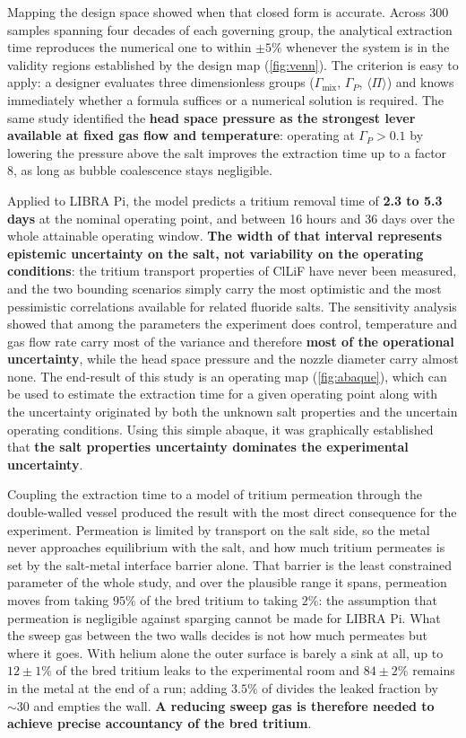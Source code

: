 \documentclass[a4paper,11pt,oneside]{report}
\newcommand{\Gmix}{\ensuremath{\Gamma_\mathrm{mix}}}
\newcommand{\Gp}{\ensuremath{\Gamma_P}}
\newcommand{\PI}{\ensuremath{\langle \Pi \rangle}}
\newcounter{assumption}[chapter]
\begin{document}
Mapping the design space showed when that closed form is accurate. Across 300 samples spanning four decades of each governing group, the analytical extraction time reproduces the numerical one to within $\pm5\%$ whenever the system is in the validity regions established by the design map (\cref{fig:venn}). The criterion is easy to apply: a designer evaluates three dimensionless groups (\Gmix, \Gp, \PI) and knows immediately whether a formula suffices or a numerical solution is required. The same study identified the \textbf{head space pressure as the strongest lever available at fixed gas flow and temperature}: operating at $\Gp>0.1$ by lowering the pressure above the salt improves the extraction time up to a factor 8, as long as bubble coalescence stays negligible.


Applied to LIBRA Pi, the model predicts a tritium removal time of \textbf{2.3 to 5.3 days} at the nominal operating point, and between 16 hours and 36 days over the whole attainable operating window. \textbf{The width of that interval represents epistemic uncertainty on the salt, not variability on the operating conditions}: the tritium transport properties of ClLiF have never been measured, and the two bounding scenarios simply carry the most optimistic and the most pessimistic correlations available for related fluoride salts. The sensitivity analysis showed that among the parameters the experiment does control, temperature and gas flow rate carry most of the variance and therefore \textbf{most of the operational uncertainty}, while the head space pressure and the nozzle diameter carry almost none. The end-result of this study is an operating map (\cref{fig:abaque}), which can be used to estimate the extraction time for a given operating point along with the uncertainty originated by both the unknown salt properties and the uncertain operating conditions. Using this simple abaque, it was graphically established that \textbf{the salt properties uncertainty dominates the experimental uncertainty}. 

Coupling the extraction time to a model of tritium permeation through the double-walled vessel produced the result with the most direct consequence for the experiment. Permeation is limited by transport on the salt side, so the metal never approaches equilibrium with the salt, and how much tritium permeates is set by the salt-metal interface barrier alone. That barrier is the least constrained parameter of the whole study, and over the plausible range it spans, permeation moves from taking $95\%$ of the bred tritium to taking $2\%$: the assumption that permeation is negligible against sparging cannot be made for LIBRA Pi. What the sweep gas between the two walls decides is not how much permeates but where it goes. With helium alone the outer surface is barely a sink at all, up to $12\pm1\%$ of the bred tritium leaks to the experimental room and $84\pm2\%$ remains in the metal at the end of a run; adding $3.5\%$ of  divides the leaked fraction by $\sim30$ and empties the wall. \textbf{A reducing sweep gas is therefore needed to achieve precise accountancy of the bred tritium}.
\end{document}
